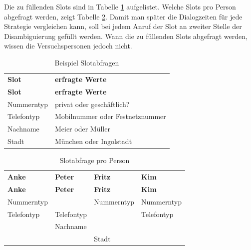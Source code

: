 \documentclass[12pt,a4paper]{scrartcl}
\begin{document}
Die zu füllenden Slots sind in Tabelle \ref{slots} aufgelistet. Welche Slots pro Person abgefragt werden, zeigt Tabelle \ref{slotsPerson}. Damit man später die Dialogzeiten für jede Strategie vergleichen kann, soll bei jedem Anruf der Slot an zweiter Stelle der Disambiguierung gefüllt werden. Wann die zu füllenden Slots abgefragt werden, wissen die Versuchspersonen jedoch nicht.  

\begin{longtable}{p{6cm}p{8cm}}
	\label{slots}\\
	\caption[Slotabfragen]{Beispiel Slotabfragen}\\
	\hline
	\textbf{Slot} &	\textbf{erfragte Werte}\\
	\hline
	\endfirsthead
	\hline
	\textbf{Slot} &	\textbf{erfragte Werte}\\
	\hline
	\endhead
Nummerntyp & privat oder geschäftlich?\\
Telefontyp & Mobilnummer oder Festnetznummer\\
Nachname & Meier oder Müller\\
Stadt & München oder Ingolstadt\\


\hline
\end{longtable}


\begin{longtable}{p{}p{}p{}p{}}
	\label{slotsPerson}\\
	\caption[Slotabfrage pro Person]{Slotabfrage pro Person}\\
	\hline
	\textbf{Anke}&\textbf{Peter}&\textbf{Fritz} &\textbf{Kim}\\
	\hline
	\endfirsthead
	\hline
	\textbf{Anke}&\textbf{Peter}&\textbf{Fritz} &\textbf{Kim}\\
	\hline
	\endhead
Nummerntyp & & Nummerntyp & Nummerntyp\\
Telefontyp & Telefontyp & & Telefontyp \\
& Nachname & & \\
& & Stadt & \\

\hline
\end{longtable}
\end{document}

